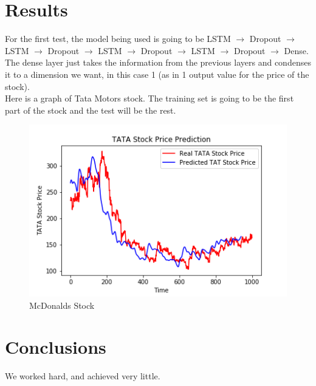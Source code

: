 \documentclass[12pt]{article}
\begin{document}
\section{Results}
For the first test, the model being used is going to be LSTM $\rightarrow$ Dropout $\rightarrow$ LSTM $\rightarrow$ Dropout $\rightarrow$ LSTM $\rightarrow$ Dropout $\rightarrow$ LSTM $\rightarrow$ Dropout $\rightarrow$ Dense. The dense layer just takes the information from the previous layers and condenses it to a dimension we want, in this case 1 (as in 1 output value for the price of the stock). \\
Here is a graph of Tata Motors stock. The training set is going to be the first part of the stock and the test will be  the rest. 
\begin{figure}[H]
  \includegraphics[width=\linewidth]{images/T1.png}
  \caption{McDonalds Stock}
\end{figure}

\section{Conclusions}\label{conclusions}
We worked hard, and achieved very little.




\end{document}
